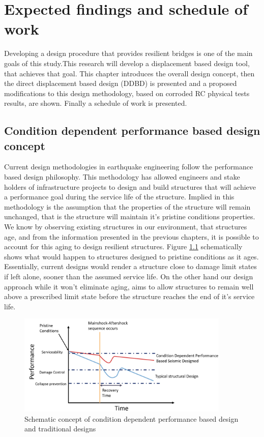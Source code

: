 \chapter{Expected findings and schedule of work}
Developing a design procedure that provides resilient bridges is one of the main goals of this study.This research will develop a displacement based design tool, that achieves that goal. This chapter introduces the overall design concept, then the direct displacement based design (DDBD) is presented and a proposed modifications to this design methodology, based on corroded RC physical tests results, are shown. Finally a schedule of work is presented.

\section{Condition dependent performance based design concept}

Current design methodologies in earthquake engineering follow the performance based design philosophy. This methodology has allowed engineers and stake holders of infrastructure projects to design and build structures that will achieve a performance goal during the service life of the structure. Implied in this methodology is the assumption that the properties of the structure will remain unchanged, that is the structure will maintain it's pristine conditions properties. We know by observing existing structures in our environment, that structures age, and from the information presented in the previous chapters, it is possible to account for this aging to design resilient structures. Figure \ref{fig:Concept_CD-DDBD} schematically shows what would happen to structures designed to pristine conditions as it ages. Essentially, current designs would render a structure close to damage limit states if left alone, sooner than the assumed service life. On the other hand our design approach while it won't eliminate aging, aims to allow structures to remain well above a prescribed limit state before the structure reaches the end of it's service life. 

\begin{figure}[htbp]
	\centering
	\includegraphics[width=0.90\textwidth]{VAC Prelim 2.0/Chapter-5/figs/CD_DDBD_Concept.png}
	\caption{Schematic concept of condition dependent performance based design and traditional designs}
	\label{fig:Concept_CD-DDBD}
\end{figure}

